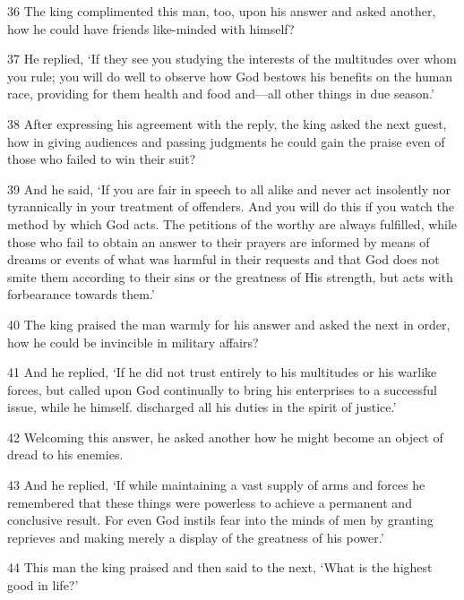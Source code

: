 \par 36 The king complimented this man, too, upon his answer and asked another, how he could have friends like-minded with himself?

\par 37 He replied, ‘If they see you studying the interests of the multitudes over whom you rule; you will do well to observe how God bestows his benefits on the human race, providing for them health and food and—all other things in due season.’

\par 38 After expressing his agreement with the reply, the king asked the next guest, how in giving audiences and passing judgments he could gain the praise even of those who failed to win their suit?

\par 39 And he said, ‘If you are fair in speech to all alike and never act insolently nor tyrannically in your treatment of offenders. And you will do this if you watch the method by which God acts. The petitions of the worthy are always fulfilled, while those who fail to obtain an answer to their prayers are informed by means of dreams or events of what was harmful in their requests and that God does not smite them according to their sins or the greatness of His strength, but acts with forbearance towards them.’

\par 40 The king praised the man warmly for his answer and asked the next in order, how he could be invincible in military affairs?

\par 41 And he replied, ‘If he did not trust entirely to his multitudes or his warlike forces, but called upon God continually to bring his enterprises to a successful issue, while he himself. discharged all his duties in the spirit of justice.’

\par 42 Welcoming this answer, he asked another how he might become an object of dread to his enemies.

\par 43 And he replied, ‘If while maintaining a vast supply of arms and forces he remembered that these things were powerless to achieve a permanent and conclusive result. For even God instils fear into the minds of men by granting reprieves and making merely a display of the greatness of his power.’

\par 44 This man the king praised and then said to the next, ‘What is the highest good in life?’

